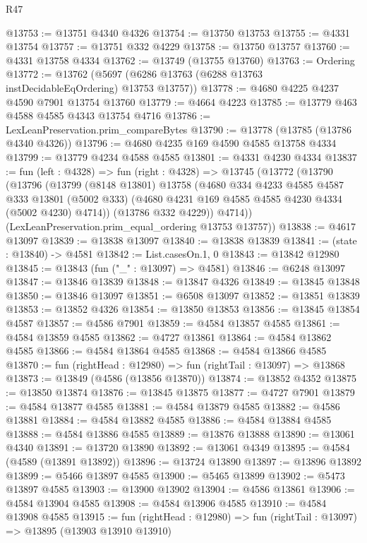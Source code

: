 \begin{lexlean}{R47}
\begin{coremodule}
@13753 := @13751 @4340 @4326
@13754 := @13750 @13753
@13755 := @4331 @13754
@13757 := @13751 @332 @4229
@13758 := @13750 @13757
@13760 := @4331 @13758 @4334
@13762 := @13749 (@13755 @13760)
@13763 := Ordering
@13772 := @13762 (@5697 (@6286 @13763 (@6288 @13763 instDecidableEqOrdering) @13753 @13757))
@13778 := @4680 @4225 @4237 @4590 @7901 @13754 @13760
@13779 := @4664 @4223
@13785 := @13779 @463 @4588 @4585 @4343 @13754 @4716
@13786 := LexLeanPreservation.prim_compareBytes
@13790 := @13778 (@13785 (@13786 @4340 @4326))
@13796 := @4680 @4235 @169 @4590 @4585 @13758 @4334
@13799 := @13779 @4234 @4588 @4585
@13801 := @4331 @4230 @4334
@13837 := fun (left : @4328) =>
  fun (right : @4328) =>
  @13745
    (@13772
      (@13790
        (@13796
          (@13799
            (@8148 @13801)
            @13758
            (@4680
              @334
              @4233
              @4585
              @4587
              @333
              @13801
              (@5002 @333)
              (@4680 @4231 @169 @4585 @4585 @4230 @4334 (@5002 @4230) @4714))
            (@13786 @332 @4229))
          @4714))
      (LexLeanPreservation.prim_equal_ordering @13753 @13757))
@13838 := @4617 @13097
@13839 := @13838 @13097
@13840 := @13838 @13839
@13841 := (state : @13840) -> @4581
@13842 := List.casesOn.{1, 0}
@13843 := @13842 @12980
@13845 := @13843 (fun ("_" : @13097) => @4581)
@13846 := @6248 @13097
@13847 := @13846 @13839
@13848 := @13847 @4326
@13849 := @13845 @13848
@13850 := @13846 @13097
@13851 := @6508 @13097
@13852 := @13851 @13839
@13853 := @13852 @4326
@13854 := @13850 @13853
@13856 := @13845 @13854 @4587
@13857 := @4586 @7901
@13859 := @4584 @13857 @4585
@13861 := @4584 @13859 @4585
@13862 := @4727 @13861
@13864 := @4584 @13862 @4585
@13866 := @4584 @13864 @4585
@13868 := @4584 @13866 @4585
@13870 := fun (rightHead : @12980) => fun (rightTail : @13097) => @13868
@13873 := @13849 (@4586 (@13856 @13870))
@13874 := @13852 @4352
@13875 := @13850 @13874
@13876 := @13845 @13875
@13877 := @4727 @7901
@13879 := @4584 @13877 @4585
@13881 := @4584 @13879 @4585
@13882 := @4586 @13881
@13884 := @4584 @13882 @4585
@13886 := @4584 @13884 @4585
@13888 := @4584 @13886 @4585
@13889 := @13876 @13888
@13890 := @13061 @4340
@13891 := @13720 @13890
@13892 := @13061 @4349
@13895 := @4584 (@4589 (@13891 @13892))
@13896 := @13724 @13890
@13897 := @13896 @13892
@13899 := @5466 @13897 @4585
@13900 := @5465 @13899
@13902 := @5473 @13897 @4585
@13903 := @13900 @13902
@13904 := @4586 @13861
@13906 := @4584 @13904 @4585
@13908 := @4584 @13906 @4585
@13910 := @4584 @13908 @4585
@13915 := fun (rightHead : @12980) => fun (rightTail : @13097) => @13895 (@13903 @13910 @13910)

\end{coremodule}
\end{lexlean}
